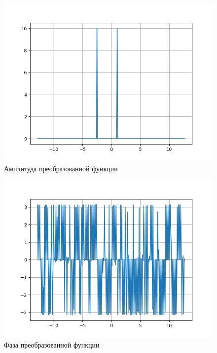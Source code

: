 {    \begin{figure}[H]
       \centering
            \includegraphics[width=\textwidth,height=\textheight,keepaspectratio]{Amplitude_bokunofft.png}
            \caption{Амплитуда преобразованной функции}
            \label{bokunofourieramplitude}
    \end{figure}
    
    \begin{figure}[H]
       \centering
            \includegraphics[width=\textwidth,height=\textheight,keepaspectratio]{Phase_bokunofft.png}
            \caption{Фаза преобразованной функции}
            \label{bokunofourierphase}
    \end{figure}
}

